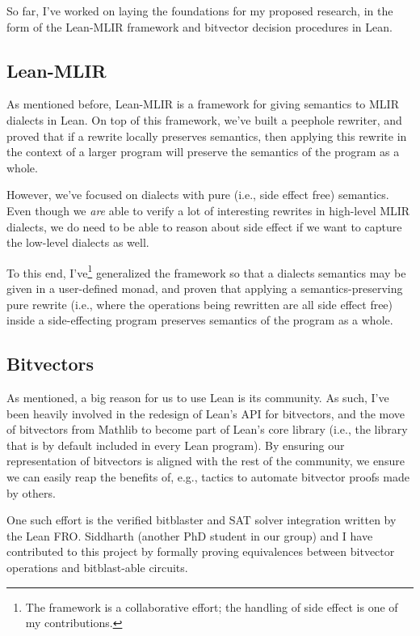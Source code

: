 \documentclass[a4paper]{scrartcl}
\begin{document}
So far, I've worked on laying the foundations for my proposed research, in the form of the Lean-MLIR framework and bitvector decision procedures in Lean.


\subsection{Lean-MLIR}\label{lean-mlir}

As mentioned before, Lean-MLIR is a framework for giving semantics to MLIR dialects in Lean.
On top of this framework, we've built a peephole rewriter, and proved
that if a rewrite locally preserves semantics, then applying this
rewrite in the context of a larger program will preserve the semantics
of the program as a whole.

However, we've focused on dialects with pure (i.e., side effect free)
semantics. Even though we \emph{are} able to verify a lot of interesting
rewrites in high-level MLIR dialects, we do need to be able to reason
about side effect if we want to capture the low-level dialects as well.

To this end, I've\footnote{The framework is a collaborative effort; the handling of side effect is one of my contributions.} generalized the framework so that a dialects
semantics may be given in a user-defined monad, and proven that applying
a semantics-preserving pure rewrite (i.e., where the operations being
rewritten are all side effect free) inside a side-effecting program
preserves semantics of the program as a whole. 


\subsection{Bitvectors}\label{bitvectors}

As mentioned, a big reason for us to use Lean is its community. As
such, I've been heavily involved in the redesign of Lean's API for
bitvectors, and the move of bitvectors from Mathlib to become part of Lean's core library
(i.e., the library that is by default included in every Lean program).
By ensuring our representation of bitvectors is aligned with the rest of
the community, we ensure we can easily reap the benefits of, e.g.,
tactics to automate bitvector proofs made by others.

One such effort is the verified bitblaster and SAT solver integration written by the Lean FRO.
Siddharth (another PhD student in our group) and I have contributed to this project by 
formally proving equivalences between bitvector operations and bitblast-able circuits.
\end{document}
